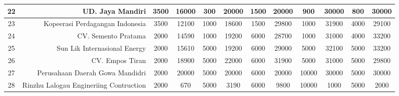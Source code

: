 \documentclass{article}
\begin{document}
\begin{table}[h]
\begin{tabular}{|c|r|c|c|c|c|c|c|c|c|c|c|}
		\hline
		22 & UD. Jaya Mandiri &       3500 &      16000 &        300 &      20000 &       1500 &      20000 &        900 &      30000 &        800 &      30000 \\
		\hline
		23 & Kopeerasi Perdagangan Indonesia &       3500 &      12100 &       1000 &      18600 &       1500 &      29800 &       1000 &      31900 &       4000 &      29100 \\
		\hline
		24 & CV. Semento Pratama &       2000 &      14590 &       1000 &      19200 &       6000 &      28700 &       1000 &      31000 &       4000 &      33200 \\
		\hline
		25 & Sun Lik Internasional Energy &       2000 &      15610 &       5000 &      19200 &       6000 &      29000 &       5000 &      32100 &       5000 &      33200 \\
		\hline
		26 & CV. Empos Tiran &       2000 &      18900 &       5000 &      22000 &       6000 &      31900 &       5000 &      31000 &       5000 &      29800 \\
		\hline
		27 & Perusahaan Daerah Gowa Mandidri &       2000 &      20000 &       5000 &      20000 &       6000 &      20000 &      10000 &      30000 &       5000 &      30000 \\
		\hline
		28 & Rinzhu Lalogau Engineriing Contruction &       2000 &        670 &       5000 &       3190 &       6000 &       9800 &      10000 &       1000 &       5000 &       2000 \\
		\hline
	\end{tabular}  
	
\end{table}
\end{document}
